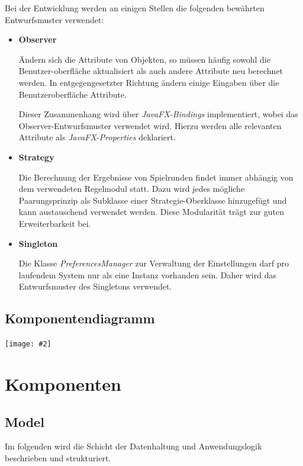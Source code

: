 \documentclass[11pt]{article}
\newcommand{\includediagram}[2]{
	\begin{center}
		\texttt{[image: \#2]}
	\end{center}
}
\begin{document}
Bei der Entwicklung werden an einigen Stellen die folgenden bewährten Entwurfsmuster verwendet:
\begin{itemize}
	\item[] \textbf{Observer} \hfill
	
	\leftskip 1cm
	Ändern sich die Attribute von Objekten, so müssen häufig sowohl die Benutzer-oberfläche aktualisiert als auch andere Attribute neu berechnet werden. In entgegengesetzter Richtung ändern einige Eingaben über die Benutzeroberfläche Attribute.
	
	Dieser Zusammenhang wird über \textit{JavaFX-Bindings} implementiert, wobei das Observer-Entwurfsmuster verwendet wird. Hierzu werden alle relevanten Attribute als \textit{JavaFX-Properties} deklariert.

	\leftskip 0cm
	\item[] \textbf{Strategy} \hfill
	
	\leftskip 1cm
	Die Berechnung der Ergebnisse von Spielrunden findet immer abhängig von dem verwendeten Regelmodul statt. Dazu wird jedes mögliche Paarungsprinzip als Subklasse einer Strategie-Oberklasse hinzugefügt und kann austauschend verwendet werden. Diese Modularität trägt zur guten Erweiterbarkeit bei.
	
	\leftskip 0cm
	\item[] \textbf{Singleton} \hfill
	
	\leftskip 1cm
	Die Klasse \textit{PreferencesManager} zur Verwaltung der Einstellungen darf pro laufendem System nur als eine Instanz vorhanden sein. Daher wird das Entwurfsmuster des Singletons verwendet.
\end{itemize}

\subsection{Komponentendiagramm}

\includediagram{0.7}{component-diagram.png}

\newpage

\section{Komponenten}

\subsection{Model}

Im folgenden wird die Schicht der Datenhaltung und Anwendungslogik beschrieben und strukturiert.
\end{document}
